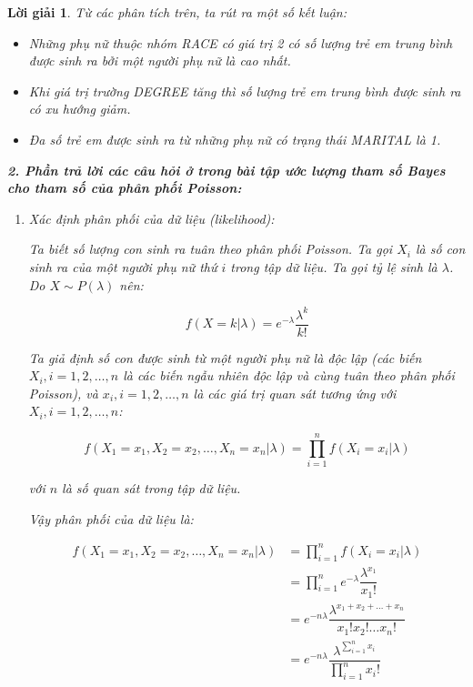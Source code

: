 \documentclass[14pt, a4paper]{article}
\theoremstyle{sltheorem}
\theoremstyle{soltheorem}
\newtheorem*{loigiai}{Lời giải}
\begin{document}
\begin{loigiai}
    Từ các phân tích trên, ta rút ra một số kết luận:

    \begin{itemize}
        \item Những phụ nữ thuộc nhóm RACE có giá trị 2 có số lượng trẻ em trung bình được sinh ra bởi một người phụ nữ là cao nhất.
        \item Khi giá trị trường DEGREE tăng thì số lượng trẻ em trung bình được sinh ra có xu hướng giảm.
        \item Đa số trẻ em được sinh ra từ những phụ nữ có trạng thái MARITAL là 1.
    \end{itemize}

    \textbf{2. Phần trả lời các câu hỏi ở trong bài tập ước lượng tham số Bayes cho tham số của phân phối Poisson:}

    \begin{enumerate}
        \item Xác định phân phối của dữ liệu (likelihood):
        
        Ta biết số lượng con sinh ra tuân theo phân phối Poisson.
        Ta gọi $X_i$ là số con sinh ra của một người phụ nữ thứ $i$ trong tập dữ liệu.
        Ta gọi tỷ lệ sinh là $\lambda$.
        Do $X \sim P(\lambda)$ nên:

        \begin{equation*}
            f(X=k \vert \lambda) = e^{-\lambda} \dfrac{\lambda^k}{k!}
        \end{equation*}

        Ta giả định số con được sinh từ một người phụ nữ là độc lập (các biến $X_i, i=1,2,\dots,n$ là các biến ngẫu nhiên độc lập và cùng tuân theo phân phối Poisson), và $x_i, i=1, 2, \dots, n$ là các giá trị quan sát tương ứng với $X_i, i=1, 2, \dots, n$:

        \begin{equation*}
            f(X_1=x_1,X_2=x_2,\dots, X_n=x_n \vert \lambda) = \prod_{i=1}^n f(X_i = x_i \vert \lambda)
        \end{equation*}

        với $n$ là số quan sát trong tập dữ liệu.

        Vậy phân phối của dữ liệu là:

        \begin{equation*}
            \begin{aligned}
                f(X_1=x_1,X_2=x_2,\dots, X_n=x_n \vert \lambda) &= \prod_{i=1}^n f(X_i = x_i \vert \lambda) \\
                &= \prod_{i=1}^n e^{-\lambda} \dfrac{\lambda^{x_1}}{x_1!} \\
                &= e^{-n\lambda} \dfrac{\lambda^{x_1 + x_2 + \dots + x_n}}{x_1! x_2! \dots x_n!} \\
                &= e^{-n\lambda} \dfrac{\lambda^{\sum_{i=1}^n x_i}}{\prod_{i=1}^n x_i!}
            \end{aligned}
        \end{equation*}


\end{enumerate}
\end{loigiai}
\end{document}
